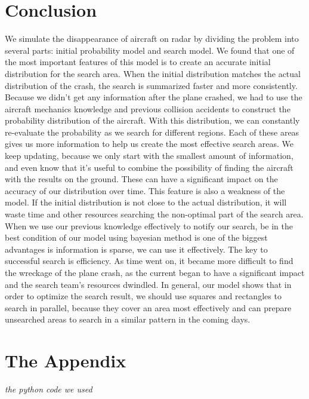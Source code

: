 \documentclass[11pt]{article}
\begin{document}
    \hypertarget{conclusion}{%
\section{Conclusion}\label{conclusion}}

We simulate the disappearance of aircraft on radar by dividing the
problem into several parts: initial probability model and search model.
We found that one of the most important features of this model is to
create an accurate initial distribution for the search area. When the
initial distribution matches the actual distribution of the crash, the
search is summarized faster and more consistently. Because we didn't get
any information after the plane crashed, we had to use the aircraft
mechanics knowledge and previous collision accidents to construct the
probability distribution of the aircraft. With this distribution, we can
constantly re-evaluate the probability as we search for different
regions. Each of these areas gives us more information to help us create
the most effective search areas. We keep updating, because we only start
with the smallest amount of information, and even know that it's useful
to combine the possibility of finding the aircraft with the results on
the ground. These can have a significant impact on the accuracy of our
distribution over time. This feature is also a weakness of the model. If
the initial distribution is not close to the actual distribution, it
will waste time and other resources searching the non-optimal part of
the search area. When we use our previous knowledge effectively to
notify our search, be in the best condition of our model using bayesian
method is one of the biggest advantages is information is sparse, we can
use it effectively. The key to successful search is efficiency. As time
went on, it became more difficult to find the wreckage of the plane
crash, as the current began to have a significant impact and the search
team's resources dwindled. In general, our model shows that in order to
optimize the search result, we should use squares and rectangles to
search in parallel, because they cover an area most effectively and can
prepare unsearched areas to search in a similar pattern in the coming
days.

    \hypertarget{the-appendix}{%
\section{The Appendix}\label{the-appendix}}

\emph{the python code we used}
\end{document}
